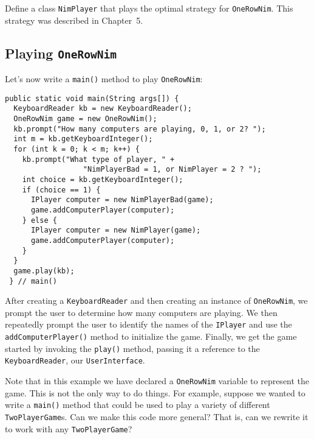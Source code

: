 \pagebreak
{}
\begin{SSTUDY}

\item Define a class {\tt NimPlayer} that plays the optimal strategy
for {\tt OneRowNim}. This strategy was described in Chapter~5. 

\end{SSTUDY}

\subsection{Playing {\tt OneRowNim}}

Let's now write a {\tt main()} method to play {\tt OneRowNim}:

\begin{jjjlisting}[26.5pc]
\begin{lstlisting}
public static void main(String args[]) {
  KeyboardReader kb = new KeyboardReader();
  OneRowNim game = new OneRowNim();
  kb.prompt("How many computers are playing, 0, 1, or 2? ");
  int m = kb.getKeyboardInteger();
  for (int k = 0; k < m; k++) {
    kb.prompt("What type of player, " + 
                  "NimPlayerBad = 1, or NimPlayer = 2 ? ");
    int choice = kb.getKeyboardInteger();
    if (choice == 1) {
      IPlayer computer = new NimPlayerBad(game);
      game.addComputerPlayer(computer);
    } else {
      IPlayer computer = new NimPlayer(game);
      game.addComputerPlayer(computer);
    }
  }
  game.play(kb);
 } // main()
\end{lstlisting}
\end{jjjlisting}

\noindent After creating a {\tt KeyboardReader} and then creating an
instance of {\tt OneRowNim}, we prompt the user to determine how many
computers are playing. We then repeatedly prompt the user to identify
the names of the {\tt IPlayer} and use the {\tt addComputerPlayer()}
method to initialize the game.  Finally, we get the game started by
invoking the {\tt play()} method, passing it a reference to the {\tt
KeyboardReader}, our {\tt UserInterface}.

Note that in this example we have declared a {\tt OneRowNim} variable
to represent the game.  This is not the only way to do things.  For
example, suppose we wanted to write a {\tt main()} method that could
be used to play a variety of different {\tt TwoPlayerGame}s.  Can we
make this code more general? That is, can we rewrite it to work with
any {\tt TwoPlayerGame}?

